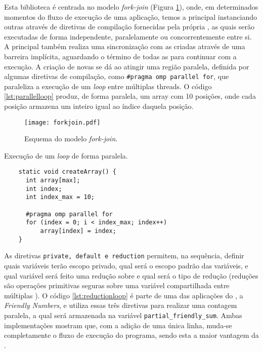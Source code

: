 Esta biblioteca é centrada no modelo \textit{fork-join} (Figura \ref{fig:forkjoin}), onde, em determinados momentos do fluxo de execução de uma aplicação, temos a \thread principal instanciando outras \threads através de diretivas de compilação fornecidas pela própria \API, as quais serão executadas de forma independente, paralelamente ou concorrentemente entre si. A \thread principal também realiza uma sincronização com as \threads criadas através de uma barreira implícita, aguardando o término de todas as \threads para continuar com a execução. A criação de novas \threads se dá ao atingir uma região paralela, definida por algumas diretivas de compilação, como \texttt{\#pragma omp parallel for}, que paraleliza a execução de um \textit{loop} entre múltiplas threads. O código \ref{lst:parallelloop} produz, de forma paralela, um array com 10 posições, onde cada posição armazena um inteiro igual ao índice daquela posição.


\begin{figure}[tb]
  \centering
  \caption{Esquema do modelo \textit{fork-join}.}
  \label{fig:forkjoin}
  \texttt{[image: forkjoin.pdf]}
\end{figure}

\begin{listing}[tb]
\caption{Execução de um \textit{loop} de forma paralela.}
\label{lst:parallelloop}
\begin{verbatim}
    static void createArray() {
      int array[max];
      int index;
      int index_max = 10;

      #pragma omp parallel for
      for (index = 0; i < index_max; index++)
          array[index] = index;
    }
\end{verbatim}
\end{listing}

As diretivas \texttt{private, default e reduction} permitem, na sequência, definir quais variáveis terão escopo privado, qual será o escopo padrão das variáveis, e qual variável será feito uma redução sobre e qual será o tipo de redução (reduções são operações primitivas seguras sobre uma variável compartilhada entre múltiplas \threads). O código \ref{lst:reductionloop} é parte de uma das aplicações do \capb, a \textit{Friendly Numbers}, e utiliza essas três diretivas para realizar uma contagem paralela, a qual será armazenada na variável \texttt{partial\_friendly\_sum}. Ambas implementações mostram que, com a adição de uma única linha, muda-se completamente o fluxo de execução do programa, sendo esta a maior vantagem da \OpenMP.

